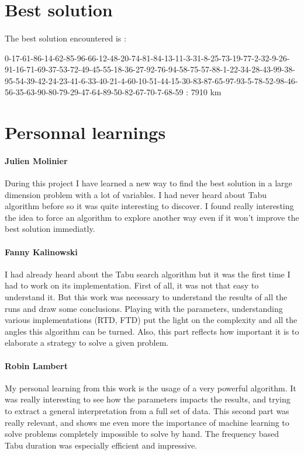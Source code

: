 \documentclass[12pt,oneside,a4paper]{article}
\begin{document}
\section{Best solution}

\paragraph{}
The best solution encountered is : 

0-17-61-86-14-62-85-96-66-12-48-20-74-81-84-13-11-3-31-8-25-73-19-77-2-32-9-26-91-16-71-69-37-53-72-49-45-55-18-36-27-92-76-94-58-75-57-88-1-22-34-28-43-99-38-95-54-39-42-24-23-41-6-33-40-21-4-60-10-51-44-15-30-83-87-65-97-93-5-78-52-98-46-56-35-63-90-80-79-29-47-64-89-50-82-67-70-7-68-59 : 7910 km

\section{Personnal learnings}

\paragraph{Julien Molinier}
During this project I have learned a new way to find the best solution in a large dimension problem with a lot of variables. 
I had never heard about Tabu algorithm before so it was quite interesting to discover.
I found really interesting the idea to force an algorithm to explore another way even if it 
won't improve the best solution immediatly. 

\paragraph{Fanny Kalinowski}
I had already heard about the Tabu search algorithm but it was the first time I had to work on its implementation. 
First of all, it was not that easy to understand it. 
But this work was necessary to understand the results of all the runs and draw some conclusions. 
Playing with the parameters, understanding various implementations (RTD, FTD) put the light on the complexity 
and all the angles this algorithm can be turned. Also, this part reflects how important it is to 
elaborate a strategy to solve a given problem.


\paragraph{Robin Lambert}
My personal learning from this work is the usage of a very powerful algorithm. 
It was really interesting to see how the parameters impacts the results, 
and trying to extract a general interpretation from a full set of data. 
This second part was really relevant, and shows me even more the importance of  
machine learning to solve problems completely impossible to solve by hand. 
The frequency based Tabu duration was especially efficient and impressive. 
\end{document}

